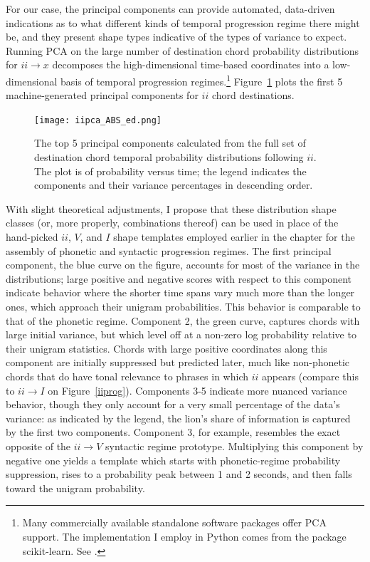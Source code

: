For our case, the principal components can provide automated, data-driven indications as to what different kinds of temporal progression regime there might be, and they present shape types indicative of the types of variance to expect.  Running PCA on the large number of destination chord probability distributions for $ii \rightarrow x$ decomposes the high-dimensional time-based coordinates into a low-dimensional basis of temporal progression regimes.\footnote{Many commercially available standalone software packages offer PCA support.  The implementation I employ in Python comes from the package scikit-learn.  See \cite{scikit-learn}.}  Figure~\ref{ii_pca} plots the first 5 machine-generated principal components for $ii$ chord destinations.

\begin{figure}
	\centering
	\caption{The top 5 principal components calculated from the full set of destination chord temporal probability distributions following $ii$.  The plot is of probability versus time; the legend indicates the components and their variance percentages in descending order.}
	\texttt{[image: iipca\_ABS\_ed.png]}
	\label{ii_pca}
\end{figure}

With slight theoretical adjustments, I propose that these distribution shape classes (or, more properly, combinations thereof) can be used in place of the hand-picked $ii$, $V$, and $I$ shape templates employed earlier in the chapter for the assembly of phonetic and syntactic progression regimes.  The first principal component, the blue curve on the figure, accounts for most of the variance in the distributions; large positive and negative scores with respect to this component indicate behavior where the shorter time spans vary much more than the longer ones, which approach their unigram probabilities.  This behavior is comparable to that of the phonetic regime.  Component 2, the green curve, captures chords with large initial variance, but which level off at a non-zero log probability relative to their unigram statistics.  Chords with large positive coordinates along this component are initially suppressed but predicted later, much like non-phonetic chords that do have tonal relevance to phrases in which $ii$ appears (compare this to $ii \rightarrow I$ on Figure~\ref{iiprog}).  Components 3-5 indicate more nuanced variance behavior, though they only account for a very small percentage of the data's variance: as indicated by the legend, the lion's share of information is captured by the first two components.  Component 3, for example, resembles the exact opposite of the $ii \rightarrow V$ syntactic regime prototype.  Multiplying this component by negative one yields a template which starts with phonetic-regime probability suppression, rises to a probability peak between 1 and 2 seconds, and then falls toward the unigram probability. 

